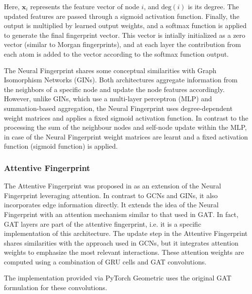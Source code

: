 Here, \(\mathbf{x}_i\) represents the feature vector of node \(i\), and \(\text{deg}(i)\) is its degree. The updated features are passed through a sigmoid activation function. Finally, the output is multiplied by learned output weights, and a softmax function is applied to generate the final fingerprint vector. This vector is intially initialized as a zero vector (similar to Morgan fingerprints), and at each layer the contribution from each atom is added to the vector according to the softmax function output.

The Neural Fingerprint shares some conceptual similarities with Graph Isomorphism Networks (GINs). Both architectures aggregate information from the neighbors of a specific node and update the node features accordingly. However, unlike GINs, which use a multi-layer perceptron (MLP) and summation-based aggregation, the Neural Fingerprint uses degree-dependent weight matrices and applies a fixed sigmoid activation function.
In contrast to the processing the sum of the neighbour nodes and self-node update within the MLP, in case of the Neural Fingerprint weight matrices are learnt and a fixed activation function (sigmoid function) is applied.


\subsubsection{Attentive Fingerprint}

The Attentive Fingerprint was proposed in \cite{Xiong.2020} as an extension of the Neural Fingerprint leveraging attention.
In contrast to GCNs and GINs, it also incorporates edge information directly. It extends the idea of the Neural Fingerprint with an attention mechanism similar to that used in GAT. In fact, GAT layers are part of the attentive fingerprint, i.e. it is a specific implementation of this architecture.
The update step in the Attentive Fingerprint shares similarities with the approach used in GCNs, but it integrates attention weights to emphasize the most relevant interactions. These attention weights are computed using a combination of GRU cells and GAT convolutions. 

The implementation provided via PyTorch Geometric uses the original GAT formulation for these convolutions.



